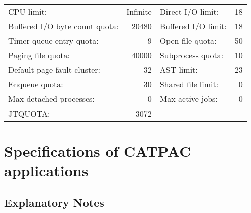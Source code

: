 \begin{tabular}[c]{lrlr}
\\
\hspace{4ex} CPU limit: & Infinite & \hspace{4ex} Direct I/O limit: & 18\\
\hspace{4ex} Buffered I/O byte count quota: & 20480 & \hspace{4ex} Buffered I/O limit: & 18\\
\hspace{4ex} Timer queue entry quota: & 9 & \hspace{4ex} Open file quota: & 50\\
\hspace{4ex} Paging file quota: & 40000 & \hspace{4ex} Subprocess quota: & 10\\
\hspace{4ex} Default page fault cluster: & 32 & \hspace{4ex} AST limit: & 23\\
\hspace{4ex} Enqueue quota: & 30 & \hspace{4ex} Shared file limit: & 0\\
\hspace{4ex} Max detached processes: & 0 & \hspace{4ex} Max active jobs: & 0\\
\hspace{4ex} JTQUOTA: & 3072 & & \\
\end{tabular}

\newpage
\section{Specifications of CATPAC applications}
\label{ap:full}
\subsection{Explanatory Notes}

